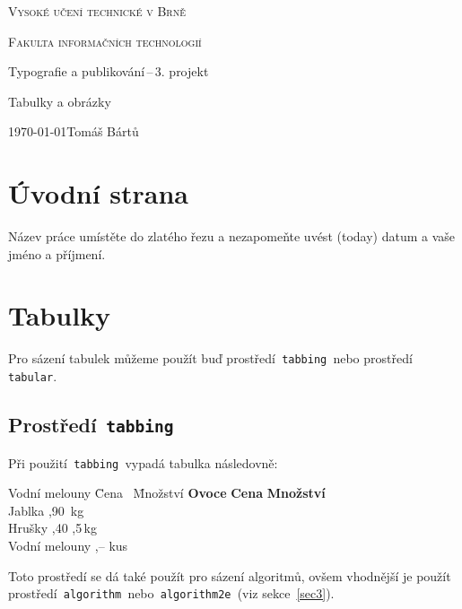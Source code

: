 \documentclass[a4paper,11pt]{article}[20-03-2022]
\begin{document}
\begin{titlepage}
    \begin{center}
        \Huge \textsc{Vysoké učení technické v Brně}

        \huge \textsc{Fakulta informačních technologií}

        
        \LARGE Typografie a publikování\,--\,3. projekt

        \Huge Tabulky a obrázky

    \end{center}
    \Large \today \hfill Tomáš Bártů
\end{titlepage}

\section{Úvodní strana}
Název práce umístěte do zlatého řezu a nezapomeňte uvést  (today) datum a vaše jméno a příjmení.

\section{Tabulky}
Pro sázení tabulek můžeme použít buď prostředí\texttt{ tabbing }nebo prostředí\texttt{ tabular}.

\subsection{Prostředí\texttt{ tabbing }}
Při použití\texttt{ tabbing }vypadá tabulka následovně:
\begin{tabbing}
    Vodní melouny \quad \= Cena \quad\  \= Množství \kill
    \textbf{Ovoce}      \> \textbf{Cena} \> \textbf{Množství}\\
    Jablka              ,90         \,kg\\
    Hrušky              ,40         ,5\,kg\\
    Vodní melouny       ,--          kus\\
\end{tabbing}
Toto prostředí se dá také použít pro sázení algoritmů, ovšem vhodnější je použít prostředí\texttt{ algorithm }nebo\texttt{ algorithm2e }(viz sekce~\ref{sec3}).
\end{document}

